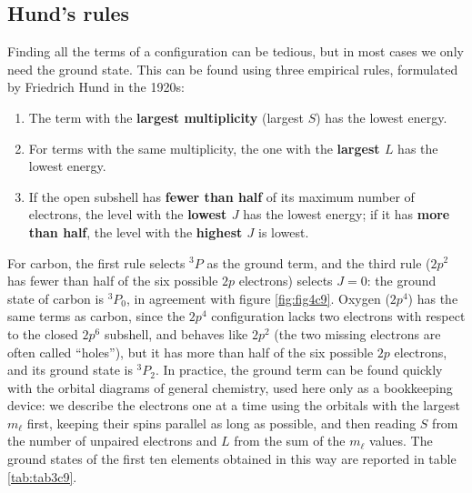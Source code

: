 \documentclass[
  english,
  9pt,
]{extbook}
\providecommand{\tightlist}{%
  \setlength{\itemsep}{0pt}\setlength{\parskip}{0pt}}
\theoremstyle{definition}
\theoremstyle{definition}
\theoremstyle{definition}
\theoremstyle{definition}
\theoremstyle{remark}
\begin{document}
\subsection{Hund's rules}\label{hunds-rules}

Finding all the terms of a configuration can be tedious, but in most cases we only need the ground state. This can be found using three empirical rules, formulated by Friedrich Hund in the 1920s:

\begin{enumerate}
\def\labelenumi{\arabic{enumi}.}
\tightlist
\item
  The term with the \textbf{largest multiplicity} (largest \(S\)) has the lowest energy.
\item
  For terms with the same multiplicity, the one with the \textbf{largest \(L\)} has the lowest energy.
\item
  If the open subshell has \textbf{fewer than half} of its maximum number of electrons, the level with the \textbf{lowest \(J\)} has the lowest energy; if it has \textbf{more than half}, the level with the \textbf{highest \(J\)} is lowest.
\end{enumerate}

For carbon, the first rule selects \(^3P\) as the ground term, and the third rule (\(2p^2\) has fewer than half of the six possible \(2p\) electrons) selects \(J=0\): the ground state of carbon is \(^3P_0\), in agreement with figure \ref{fig:fig4c9}. Oxygen (\(2p^4\)) has the same terms as carbon, since the \(2p^4\) configuration lacks two electrons with respect to the closed \(2p^6\) subshell, and behaves like \(2p^2\) (the two missing electrons are often called ``holes''), but it has more than half of the six possible \(2p\) electrons, and its ground state is \(^3P_2\). In practice, the ground term can be found quickly with the orbital diagrams of general chemistry, used here only as a bookkeeping device: we describe the electrons one at a time using the orbitals with the largest \(m_\ell\) first, keeping their spins parallel as long as possible, and then reading \(S\) from the number of unpaired electrons and \(L\) from the sum of the \(m_\ell\) values. The ground states of the first ten elements obtained in this way are reported in table \ref{tab:tab3c9}.
\end{document}
